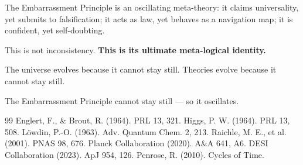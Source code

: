 \documentclass[10pt,a4paper]{article}
\begin{document}
The Embarrassment Principle is an oscillating meta-theory:
it claims universality, yet submits to falsification;
it acts as law, yet behaves as a navigation map;
it is confident, yet self-doubting.

This is not inconsistency.
\textbf{This is its ultimate meta-logical identity.}

The universe evolves because it cannot stay still.
Theories evolve because it cannot stay still.

The Embarrassment Principle cannot stay still --- so it oscillates.

\begin{thebibliography}{99}
 Englert, F., \& Brout, R. (1964). PRL 13, 321.
 Higgs, P. W. (1964). PRL 13, 508.
 Löwdin, P.-O. (1963). Adv. Quantum Chem. 2, 213.
 Raichle, M. E., et al. (2001). PNAS 98, 676.
 Planck Collaboration (2020). A\&A 641, A6.
 DESI Collaboration (2023). ApJ 954, 126.
 Penrose, R. (2010). Cycles of Time.
\end{thebibliography}
\end{document}

